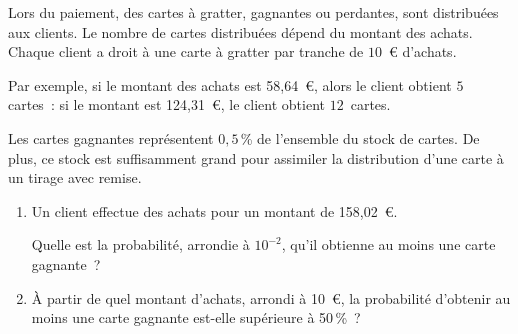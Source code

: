 \medskip
Lors du paiement, des cartes à gratter, gagnantes ou perdantes, sont distribuées aux clients. Le
nombre de cartes distribuées dépend du montant des achats. Chaque client a droit à une carte à
gratter par tranche de $10$~\euro{} d'achats.
\par
Par exemple, si le montant des achats est 58,64~\euro, alors le client obtient $5$ cartes~: si le montant est
124,31~\euro, le client obtient $12$~cartes.
\par
Les cartes gagnantes représentent $0,5$\,\% de l'ensemble du stock de cartes. De plus, ce stock est
suffisamment grand pour assimiler la distribution d'une carte à un tirage avec remise.
\medskip
\begin{enumerate}
     \item Un client effectue des achats pour un montant de 158,02~\euro.
     \par
     Quelle est la probabilité, arrondie à $10^{-2}$, qu'il obtienne au moins une carte gagnante~?
     \item  À partir de quel montant d'achats, arrondi à 10~\euro, la probabilité d'obtenir au moins une carte
     gagnante est-elle supérieure à 50\,\%~?
\end{enumerate}
